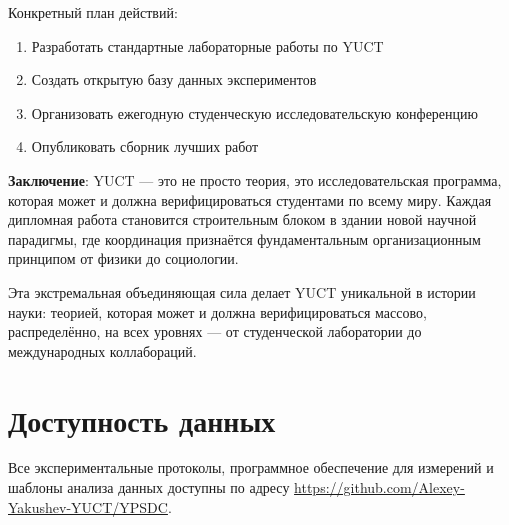 \documentclass[12pt,a4paper]{article}
\begin{document}
	Конкретный план действий:
	\begin{enumerate}
		\item Разработать стандартные лабораторные работы по YUCT
		\item Создать открытую базу данных экспериментов
		\item Организовать ежегодную студенческую исследовательскую конференцию
		\item Опубликовать сборник лучших работ
	\end{enumerate}
	
	\textbf{Заключение}: YUCT — это не просто теория, это исследовательская программа, которая может и должна верифицироваться студентами по всему миру. Каждая дипломная работа становится строительным блоком в здании новой научной парадигмы, где координация признаётся фундаментальным организационным принципом от физики до социологии.
	
	Эта экстремальная объединяющая сила делает YUCT уникальной в истории науки: теорией, которая может и должна верифицироваться массово, распределённо, на всех уровнях — от студенческой лаборатории до международных коллабораций.
	
	\section*{Доступность данных}
	Все экспериментальные протоколы, программное обеспечение для измерений и шаблоны анализа данных доступны по адресу \url{https://github.com/Alexey-Yakushev-YUCT/YPSDC}.
	
\end{document}
